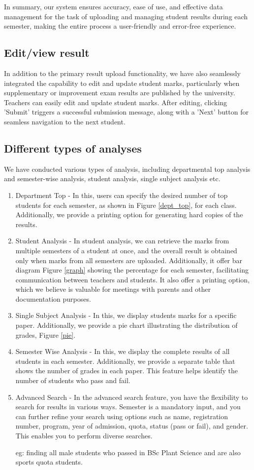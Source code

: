 \documentclass{nascproject}
\begin{document}
	In summary, our system ensures accuracy, ease of use, and effective data management for the task of uploading and managing student results during each semester, making the entire process a user-friendly and error-free experience.
\subsection{Edit/view result}
In addition to the primary result upload functionality, we have also seamlessly integrated the capability to edit and update student marks, particularly when supplementary or improvement exam results are published by the university. Teachers can easily edit and update student marks. After editing, clicking 'Submit' triggers a successful submission message, along with a 'Next' button for seamless navigation to the next student.
\subsection{Different types of analyses}
We have conducted various types of analysis, including departmental top analysis and semester-wise analysis, student analysis, single subject analysis etc.
\begin{enumerate}
	\item Department Top - In this, users can specify the desired number of top students for each semester, as shown in Figure \ref{dept_top}, for each class. Additionally, we provide a printing option for generating hard copies of the results.
	\item Student Analysis - In student analysis, we can retrieve the marks from multiple semesters of a student at once, and the overall result is obtained only when marks from all semesters are uploaded. Additionally, it offer bar diagram Figure \ref{graph} showing the percentage for each semester, facilitating communication between teachers and students. It also offer a printing option, which we believe is valuable for meetings with parents and other documentation purposes.
	\item Single Subject Analysis - In this, we display students marks for a specific paper. Additionally, we provide a pie chart illustrating the distribution of grades, Figure \ref{pie}.
	\item Semester Wise Analysis - In this, we display the complete results of all students in each semester. Additionally, we provide a separate table that shows the number of grades in each paper. This feature helps identify the number of students who pass and fail.
	\item Advanced Search - In the advanced search feature, you have the flexibility to search for results in various ways. Semester is a mandatory input, and you can further refine your search using options such as name, registration number, program, year of admission, quota, status (pass or fail), and gender. This enables you to perform diverse searches.
	
	eg: finding all male students who passed in BSc Plant Science and are also sports quota students.
	
\end{enumerate}
\end{document}
